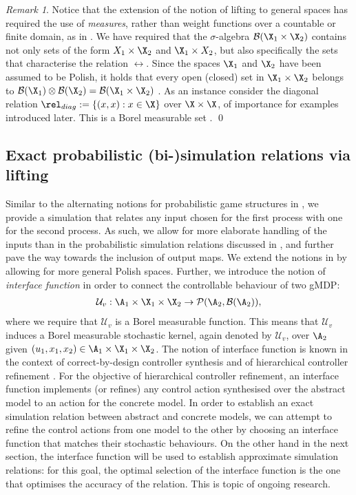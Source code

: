 \documentclass[letterpaper, 10 pt, conference]{amsart}
\theoremstyle{definition}
\theoremstyle{example}
\theoremstyle{remark}
\newtheorem{remark}{Remark}
\newcommand{\InF}{\mathcal{U}_{v}}
\begin{document}
\begin{remark}\label{rem:measdiag}
Notice that the extension of the notion of lifting to general spaces has required the use of \emph{measures}, 
rather than weight functions over a countable or finite domain, as in \cite{Segala1995}. 
We have required that the $\sigma$-algebra $\mathcal B(\X_1\times \X_2)$ contains not only sets of the form $X_1\times \X_2$ and $\X_1\times X_2$, 
but also specifically the sets that characterise the relation $\rel$. 
Since the spaces $\X_1$ and $\X_2$ have been assumed to be Polish, 
it holds that every open (closed) set in $\X_1\times \X_2$ belongs to $\mathcal B(\X_1) \otimes\mathcal{B}( \X_2)= \mathcal B(\X_1\times \X_2)$ \cite[Lemma 6.4.2]{bogachev2007measure}. 
As an instance consider the diagonal relation \(\rel_{diag}:=\{(x,x):x\in \X\}\) over $\X\times\X$, 
of importance for examples introduced later. This is a Borel measurable set \cite[Theorem 6.5.7]{bogachev2007measure}. 
\qed
\end{remark}

\subsection{Exact probabilistic (bi-)simulation relations via lifting} 
  
Similar to the alternating notions for probabilistic game structures in \cite{Zhang2010a}, 
we provide a simulation that relates any input chosen for the first process with one for the second process. 
As such, we allow for more elaborate handling of the inputs than in the probabilistic simulation relations discussed in \cite{Desharnais2008,cDAK12}, 
and further pave the way towards the inclusion of output maps.  
We extend the notions in \cite{Segala1995,Zhang2010a} by allowing for more general Polish spaces. 
Further, we introduce the notion of \emph{interface function} in order 
to connect the controllable behaviour of two gMDP:     
\begin{align*}\InF: \A_1\times \X_1\times\X_2 \rightarrow \mathcal{P}(\A_2,\mathcal B(\A_2)),\end{align*}
where we require that $\InF$ is a Borel measurable function. 
This means that $\InF$ induces a Borel measurable stochastic kernel, 
again denoted by $\InF$, 
over $\A_2$ given $(u_1,x_1,x_2)\in\A_1\times \X_1\times\X_2$.
The notion of interface function is known in the context of correct-by-design controller synthesis and of hierarchical controller refinement \cite{Girard2009,Tabuada2009b}.   
For the objective of hierarchical controller refinement, 
an interface function implements (or refines) any control action synthesised over the abstract model to an action for the concrete model. 
In order to establish an exact simulation relation between abstract and concrete models,  
we can attempt to refine the control actions from one model to the other by choosing an interface function that matches their stochastic behaviours.  
On the other hand in the next section, the interface function will be used to establish approximate simulation relations: 
for this goal, the optimal selection of the interface function is the one that optimises the accuracy of the relation.  
This is topic of ongoing research. 
\end{document}
